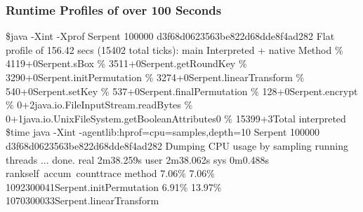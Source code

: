 \documentclass[12pt]{article} %
\newcommand{\tab}{\hspace*{2em}}
\begin{document}
\subsubsection{Runtime Profiles of over 100 Seconds}

\$java -Xint -Xprof Serpent 100000
\newline d3f68d0623563be822d68dde8f4ad282
\newline Flat profile of 156.42 secs (15402 total ticks): main
\newline Interpreted \tab + \tab native \tab  Method                        
\tab\%  4119\tab  +\tab     0\tab    Serpent.sBox
\tab\%  3511\tab  +\tab     0\tab    Serpent.getRoundKey
\tab\%  3290\tab  +\tab     0\tab    Serpent.initPermutation
\tab\%  3274\tab  +\tab     0\tab    Serpent.linearTransform
\tab\%   540\tab  +\tab     0\tab    Serpent.setKey
\tab\%   537\tab  +\tab     0\tab    Serpent.finalPermutation
\tab\%   128\tab  +\tab     0\tab    Serpent.encrypt
\tab\%     0\tab  +\tab     2\tab    java.io.FileInputStream.readBytes
\tab\%     0\tab  +\tab     1\tab    java.io.UnixFileSystem.getBooleanAttributes0
\tab\% 15399\tab  +\tab     3\tab    Total interpreted
\newline\$time java -Xint -agentlib:hprof=cpu=samples,depth=10 Serpent 100000
\newline d3f68d0623563be822d68dde8f4ad282
\newline Dumping CPU usage by sampling running threads ... done.
\newline real	2m38.259s
\newline user	2m38.062s
\newline sys	0m0.488s
\newline rank\tab  self\tab\  accum\tab\    count\tab trace \tab method
\tab  7.06\tab\%  7.06\tab\%    1092\tab 300041\tab Serpent.initPermutation
\tab  6.91\tab\% 13.97\tab\%    1070\tab 300033\tab Serpent.linearTransform
\end{document}
